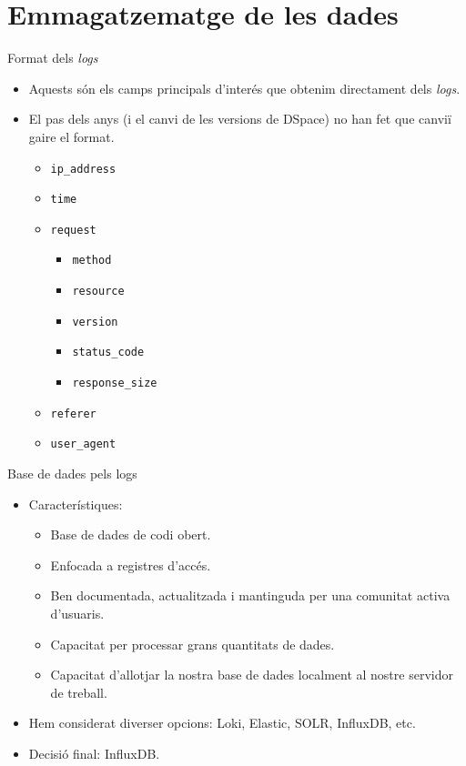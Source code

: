 \section{Emmagatzematge de les dades}\label{sec:data-storing}

\begin{frame}{Format dels \textit{logs}}

    \begin{itemize}
        \item Aquests són els camps principals d'interés que obtenim directament dels \textit{logs}.
        \item El pas dels anys (i el canvi de les versions de DSpace) no han fet que canviï gaire el format.
        \begin{itemize}
            \item \texttt{ip\_address}
            \item \texttt{time}
            \item \texttt{request}
            \begin{itemize}
                \item \texttt{method}
                \item \texttt{resource}
                \item \texttt{version}
                \item \texttt{status\_code}
                \item \texttt{response\_size}
            \end{itemize}
            \item \texttt{referer}
            \item \texttt{user\_agent}
        \end{itemize}
    \end {itemize}
\end{frame}


\begin{frame}{Base de dades pels logs}
    \begin{itemize}%
        \item Característiques:
        \begin{itemize}
            \item Base de dades de codi obert.
            \item Enfocada a registres d'accés.
            \item Ben documentada, actualitzada i mantinguda per una comunitat activa d'usuaris.
            \item Capacitat per processar grans quantitats de dades.
            \item Capacitat d'allotjar la nostra base de dades localment al nostre servidor de treball.
        \end{itemize}
        \item Hem considerat diverser opcions: Loki, Elastic, SOLR, InfluxDB, etc.
        \item Decisió final: InfluxDB.
    \end{itemize}
\end{frame}


